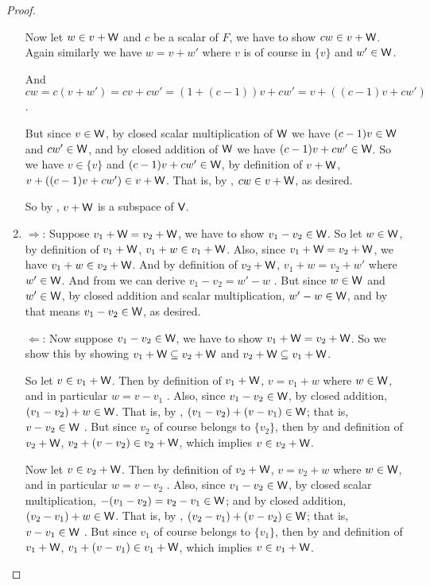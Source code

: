 \begin{proof}
\begin{enumerate}
Now let \(w \in v + \textsf{W}\) and \(c\) be a scalar of \(F\), we have to show \(cw \in v + \textsf{W}\).
Again similarly we have \(w = v + w'\) where \(v\) is of course in \(\{ v \}\) and \(w' \in \textsf{W}\).

And \(c w = c (v + w') = cv + cw' = (1 + (c - 1))v + cw' = v + ((c - 1)v + cw')\) .

But since \(v \in \textsf{W}\), by closed scalar multiplication of \(\textsf{W}\) we have \((c - 1)v \in \textsf{W}\) and \(cw' \in \textsf{W}\), and by closed addition of \(\textsf{W}\) we have \((c - 1)v + cw' \in \textsf{W}\).
So we have \(v \in \{ v \}\) and \((c - 1)v + cw' \in \textsf{W}\), by definition of \(v + \textsf{W}\), \(v + ((c - 1)v + cw') \in v + \textsf{W}\).
That is, by , \(cw \in v + \textsf{W}\), as desired.

So by , \(v + \textsf{W}\) is a subspace of \(\textsf{V}\).

\item
\(\Longrightarrow\): Suppose \(v_1 + \textsf{W} = v_2 + \textsf{W}\), we have to show \(v_1 - v_2 \in \textsf{W}\).
So let \(w \in \textsf{W}\), by definition of \(v_1 + \textsf{W}\), \(v_1 + w \in v_1 + \textsf{W}\).
Also, since \(v_1 + \textsf{W} = v_2 + \textsf{W}\), we have \(v_1 + w \in v_2 + \textsf{W}\).
And by definition of \(v_2 + \textsf{W}\), \(v_1 + w = v_2 + w'\)  where \(w' \in \textsf{W}\).
And from  we can derive \(v_1 - v_2 = w' - w\) .
But since \(w \in \textsf{W}\) and \(w' \in \textsf{W}\), by closed addition and scalar multiplication, \(w' - w \in \textsf{W}\), and by  that means \(v_1 - v_2 \in \textsf{W}\), as desired.

\(\Longleftarrow\): Now suppose \(v_1 - v_2 \in \textsf{W}\), we have to show \(v_1 + \textsf{W} = v_2 + \textsf{W}\).
So we show this by showing \(v_1 + \textsf{W} \subseteq v_2 + \textsf{W}\) and \(v_2 + \textsf{W} \subseteq v_1 + \textsf{W}\).

So let \(v \in v_1 + \textsf{W}\).
Then by definition of \(v_1 + \textsf{W}\), \(v = v_1 + w\) where \(w \in \textsf{W}\), and in particular \(w = v - v_1\) .
Also, since \(v_1 - v_2 \in \textsf{W}\), by closed addition, \((v_1 - v_2) + w \in \textsf{W}\).
That is, by , \((v_1 - v_2) + (v - v_1) \in \textsf{W}\);
that is, \(v - v_2 \in \textsf{W}\) .
But since \(v_2\) of course belongs to \(\{ v_2 \}\), then by  and definition of \(v_2 + \textsf{W}\), \(v_2 + (v - v_2) \in v_2 + \textsf{W}\), which implies \(v \in v_2 + \textsf{W}\).

Now let \(v \in v_2 + \textsf{W}\).
Then by definition of \(v_2 + \textsf{W}\), \(v = v_2 + w\) where \(w \in \textsf{W}\), and in particular \(w = v - v_2\) .
Also, since \(v_1 - v_2 \in \textsf{W}\), by closed scalar multiplication, \(-(v_1 - v_2) = v_2 - v_1 \in \textsf{W}\);
and by closed addition, \((v_2 - v_1) + w \in \textsf{W}\).
That is, by , \((v_2 - v_1) + (v - v_2) \in \textsf{W}\);
that is, \(v - v_1 \in \textsf{W}\) .
But since \(v_1\) of course belongs to \(\{ v_1 \}\), then by  and definition of \(v_1 + \textsf{W}\), \(v_1 + (v - v_1) \in v_1 + \textsf{W}\), which implies \(v \in v_1 + \textsf{W}\).


\end{enumerate}
\end{proof}
